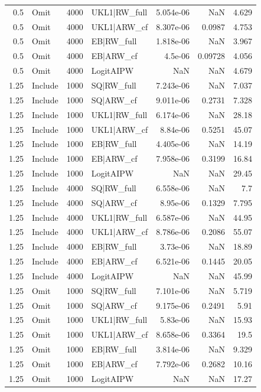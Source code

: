 \begin{tabular}{rlrlrrr}
0.5 & Omit & 4000 & UKL1|RW\_full & 5.054e-06 & NaN & 4.629 \\
0.5 & Omit & 4000 & UKL1|ARW\_cf & 8.307e-06 & 0.0987 & 4.753 \\
0.5 & Omit & 4000 & EB|RW\_full & 1.818e-06 & NaN & 3.967 \\
0.5 & Omit & 4000 & EB|ARW\_cf & 4.5e-06 & 0.09728 & 4.056 \\
0.5 & Omit & 4000 & LogitAIPW & NaN & NaN & 4.679 \\
1.25 & Include & 1000 & SQ|RW\_full & 7.243e-06 & NaN & 7.037 \\
1.25 & Include & 1000 & SQ|ARW\_cf & 9.011e-06 & 0.2731 & 7.328 \\
1.25 & Include & 1000 & UKL1|RW\_full & 6.174e-06 & NaN & 28.18 \\
1.25 & Include & 1000 & UKL1|ARW\_cf & 8.84e-06 & 0.5251 & 45.07 \\
1.25 & Include & 1000 & EB|RW\_full & 4.405e-06 & NaN & 14.19 \\
1.25 & Include & 1000 & EB|ARW\_cf & 7.958e-06 & 0.3199 & 16.84 \\
1.25 & Include & 1000 & LogitAIPW & NaN & NaN & 29.45 \\
1.25 & Include & 4000 & SQ|RW\_full & 6.558e-06 & NaN & 7.7 \\
1.25 & Include & 4000 & SQ|ARW\_cf & 8.95e-06 & 0.1329 & 7.795 \\
1.25 & Include & 4000 & UKL1|RW\_full & 6.587e-06 & NaN & 44.95 \\
1.25 & Include & 4000 & UKL1|ARW\_cf & 8.786e-06 & 0.2086 & 55.07 \\
1.25 & Include & 4000 & EB|RW\_full & 3.73e-06 & NaN & 18.89 \\
1.25 & Include & 4000 & EB|ARW\_cf & 6.521e-06 & 0.1445 & 20.05 \\
1.25 & Include & 4000 & LogitAIPW & NaN & NaN & 45.99 \\
1.25 & Omit & 1000 & SQ|RW\_full & 7.101e-06 & NaN & 5.719 \\
1.25 & Omit & 1000 & SQ|ARW\_cf & 9.175e-06 & 0.2491 & 5.91 \\
1.25 & Omit & 1000 & UKL1|RW\_full & 5.83e-06 & NaN & 15.93 \\
1.25 & Omit & 1000 & UKL1|ARW\_cf & 8.658e-06 & 0.3364 & 19.5 \\
1.25 & Omit & 1000 & EB|RW\_full & 3.814e-06 & NaN & 9.329 \\
1.25 & Omit & 1000 & EB|ARW\_cf & 7.792e-06 & 0.2682 & 10.16 \\
1.25 & Omit & 1000 & LogitAIPW & NaN & NaN & 17.27 \\

\end{tabular}
